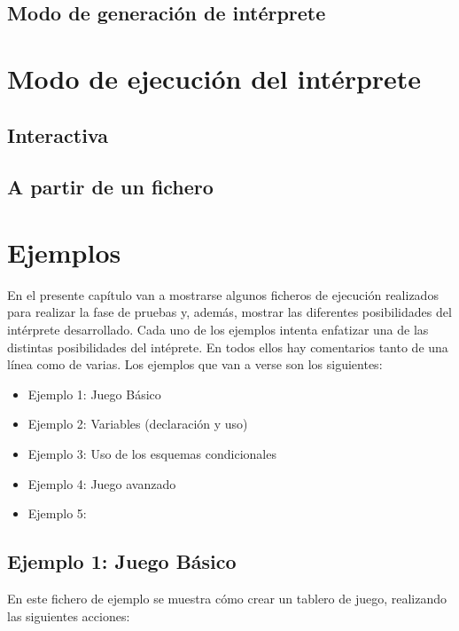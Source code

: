 \documentclass[a4paper,12pt,twoside,openright]{report}
\begin{document}
  \section{Modo de generación de intérprete}
  
\chapter{Modo de ejecución del intérprete}

  \section{Interactiva}
  
  \section{A partir de un fichero}
  
\chapter{Ejemplos}
  
  En el presente capítulo van a mostrarse algunos ficheros de ejecución realizados para realizar la fase de pruebas y, 
  además, mostrar las diferentes posibilidades del intérprete desarrollado. Cada uno de los ejemplos intenta enfatizar 
  una de las distintas posibilidades del intéprete. En todos ellos hay comentarios tanto de una línea como de varias.
  Los ejemplos que van a verse son los siguientes:
  \begin{itemize}
   \item Ejemplo 1: Juego Básico
   \item Ejemplo 2: Variables (declaración y uso)
   \item Ejemplo 3: Uso de los esquemas condicionales
   \item Ejemplo 4: Juego avanzado
   \item Ejemplo 5:
  \end{itemize}

  
  \section{Ejemplo 1: Juego Básico}
  
  En este fichero de ejemplo se muestra cómo crear un tablero de juego, 
  realizando las siguientes acciones:
  
\end{document}
